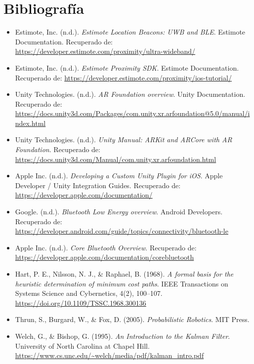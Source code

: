 \section{Bibliografía}
\begin{itemize} 
    \item Estimote, Inc. (n.d.). \textit{Estimote Location Beacons: UWB and BLE}. Estimote Documentation. Recuperado de: \url{https://developer.estimote.com/proximity/ultra-wideband/}
    
    \item Estimote, Inc. (n.d.). \textit{Estimote Proximity SDK}. Estimote Documentation. Recuperado de: \url{https://developer.estimote.com/proximity/ios-tutorial/}
    
    \item Unity Technologies. (n.d.). \textit{AR Foundation overview}. Unity Documentation. Recuperado de: \url{https://docs.unity3d.com/Packages/com.unity.xr.arfoundation@5.0/manual/index.html}
    
    \item Unity Technologies. (n.d.). \textit{Unity Manual: ARKit and ARCore with AR Foundation}. Recuperado de: \url{https://docs.unity3d.com/Manual/com.unity.xr.arfoundation.html}

    \item Apple Inc. (n.d.). \textit{Developing a Custom Unity Plugin for iOS}. Apple Developer / Unity Integration Guides. Recuperado de: \url{https://developer.apple.com/documentation/}
    
    \item Google. (n.d.). \textit{Bluetooth Low Energy overview}. Android Developers. Recuperado de: \url{https://developer.android.com/guide/topics/connectivity/bluetooth-le}
    
    \item Apple Inc. (n.d.). \textit{Core Bluetooth Overview}. Recuperado de: \url{https://developer.apple.com/documentation/corebluetooth}
    
    \item Hart, P. E., Nilsson, N. J., \& Raphael, B. (1968). \textit{A formal basis for the heuristic determination of minimum cost paths}. IEEE Transactions on Systems Science and Cybernetics, 4(2), 100–107. \url{https://doi.org/10.1109/TSSC.1968.300136}
    
    \item Thrun, S., Burgard, W., \& Fox, D. (2005). \textit{Probabilistic Robotics}. MIT Press.
    
    \item Welch, G., \& Bishop, G. (1995). \textit{An Introduction to the Kalman Filter}. University of North Carolina at Chapel Hill. \url{https://www.cs.unc.edu/~welch/media/pdf/kalman_intro.pdf}
    

\end{itemize}
